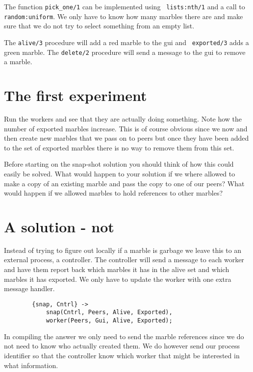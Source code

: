 \documentclass[a4paper,11pt]{article}
\begin{document}
The function {\tt pick\_one/1} can be implemented using {\tt
  lists:nth/1} and a call to {\tt random:uniform}. We only have to
know how many marbles there are and make sure that we do not try to
select something from an empty list. 

The {\tt alive/3} procedure will add a red marble to the gui and {\tt
  exported/3} adds a green marble. The {\tt delete/2} procedure will
send a message to the gui to remove a marble.

\section{The first experiment}


Run the workers and see that they are actually doing something. Note
how the number of exported marbles increase. This is of course obvious
since we now and then create new marbles that we pass on to peers but
once they have been added to the set of exported marbles there is no
way to remove them from this set.

Before starting on the snap-shot solution you should think of how this
could easily be solved. What would happen to your solution if we where
allowed to make a copy of an existing marble and pass the copy to one
of our peers?  What would happen if we allowed marbles to hold
references to other marbles?

\section{A solution - not}

Instead of trying to figure out locally if a marble is garbage we leave
this to an external process, a controller. The controller will send a
message to each worker and have them report back which marbles it has
in the alive set and which marbles it has exported. We only have to
update the worker with one extra message handler.

\begin{verbatim}
        {snap, Cntrl} ->
            snap(Cntrl, Peers, Alive, Exported),
            worker(Peers, Gui, Alive, Exported);
\end{verbatim}

In compiling the answer we only need to send the marble references
since we do not need to know who actually created them. We do however
send our process identifier so that the controller know which worker
that might be interested in what information.
\end{document}
